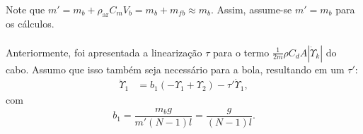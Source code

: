 \documentclass[a4paper,11pt]{scrartcl} %
\numberwithin{equation}{section} %
\numberwithin{figure}{section} %
\numberwithin{table}{section} %
\begin{document}
 \paragraph{} Note que $m' = m_b + \rho_{\textrm{ar}} C_m V_b = m_b + m_{fb} \approx m_b$. Assim, assume-se $m' = m_b$ para os cálculos.

 \paragraph{} Anteriormente, foi apresentada a linearização $\tau$ para o termo $\frac{1}{2m}\rho C_d A\left|\dot{\Upsilon}_k\right|$ do cabo. Assumo que isso também seja necessário para a bola, resultando em um $\tau'$: \begin{align}
 	\ddot{\Upsilon}_1 &= b_1\left(-\Upsilon_1 + \Upsilon_2\right) - \tau'\dot{\Upsilon}_1,
 \end{align} com \begin{equation}
 	b_1 = \frac{m_b g}{m' (N-1)l} = \frac{g}{(N-1)l}.
 \end{equation}
\end{document}
